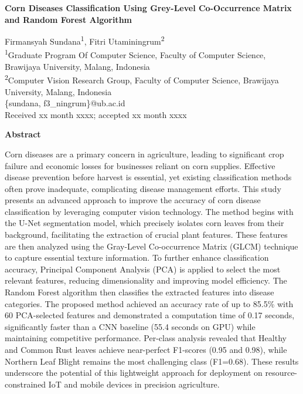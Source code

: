 \documentclass[10pt,a4paper]{article}
\begin{document}
\begin{center}
    {\fontsize{14}{17}\bfseries Corn Diseases Classification Using Grey-Level Co-Occurrence Matrix and Random Forest Algorithm\par}
    \vspace{12pt}
    {\large
        Firmansyah Sundana\textsuperscript{1}, Fitri Utaminingrum\textsuperscript{2}\\
    }
    \vspace{6pt}
    \small
    \textsuperscript{1}Graduate Program Of Computer Science, Faculty of Computer Science, Brawijaya University, Malang, Indonesia\\
    \textsuperscript{2}Computer Vision Research Group, Faculty of Computer Science, Brawijaya University, Malang, Indonesia\\
    \vspace{3pt}
    \{sundana, f3\_ningrum\}@ub.ac.id\\
    \vspace{6pt}
    Received xx month xxxx; accepted xx month xxxx
\end{center}

\vspace{6pt}
\begin{center}
    \textbf{\fontsize{10}{12}\selectfont Abstract}
\end{center}
\noindent Corn diseases are a primary concern in agriculture, leading to significant crop failure and economic losses for businesses reliant on corn supplies. Effective disease prevention before harvest is essential, yet existing classification methods often prove inadequate, complicating disease management efforts. This study presents an advanced approach to improve the accuracy of corn disease classification by leveraging computer vision technology. The method begins with the U-Net segmentation model, which precisely isolates corn leaves from their background, facilitating the extraction of crucial plant features. These features are then analyzed using the Gray-Level Co-occurrence Matrix (GLCM) technique to capture essential texture information. To further enhance classification accuracy, Principal Component Analysis (PCA) is applied to select the most relevant features, reducing dimensionality and improving model efficiency. The Random Forest algorithm then classifies the extracted features into disease categories. The proposed method achieved an accuracy rate of up to 85.5\% with 60 PCA-selected features and demonstrated a computation time of 0.17 seconds, significantly faster than a CNN baseline (55.4 seconds on GPU) while maintaining competitive performance. Per-class analysis revealed that Healthy and Common Rust leaves achieve near-perfect F1-scores (0.95 and 0.98), while Northern Leaf Blight remains the most challenging class (F1=0.68). These results underscore the potential of this lightweight approach for deployment on resource-constrained IoT and mobile devices in precision agriculture.
\end{document}

